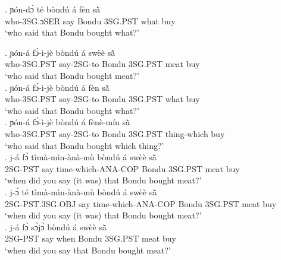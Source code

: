 \documentclass{assets/fieldnotes}
\begin{document}
\exg. ɲón-dɔ́ té bòndú á fèn sã̀\\
who-3SG.ɔSER say Bondu 3SG.PST what buy\\
`who said that Bondu bought what?' \\


\exg. ɲón-á fɔ̀-ì-jè bòndú á swèè sã̀\\
who-3SG.PST say-2SG-to Bondu 3SG.PST meat buy\\
`who said that Bondu bought meat?' \\

\exg. ɲón-á fɔ̀-ì-jè bòndú á fèn sã̀\\
who-3SG.PST say-2SG-to Bondu 3SG.PST what buy\\
`who said that Bondu bought what?' \\

\exg. ɲón-á fɔ̀-ì-jè bòndú á fènè-mín sã̀\\
who-3SG.PST say-2SG-to Bondu 3SG.PST thing-which buy\\
`who said that Bondu bought which thing?' \\

\exg. j-á fɔ̀ tìmà-mìn-ànà-mù bòndú á swèè sã̀ \\
2SG-PST say time-which-ANA-COP Bondu 3SG.PST meat buy\\
`when did you say (it was) that Bondu bought meat?' \\

\exg. j-ɔ́ té tìmà-mìn-ànà-mù bòndú á swèè sã̀ \\
2SG-PST.3SG.OBJ say time-which-ANA-COP Bondu 3SG.PST meat buy\\
`when did you say (it was) that Bondu bought meat?' \\

\exg. j-á fɔ̀ sɔ̀jɔ̀ bòndú á swèè sã̀ \\
2SG-PST say when Bondu 3SG.PST meat buy\\
`when did you say that Bondu bought meat?' \\
\end{document}
